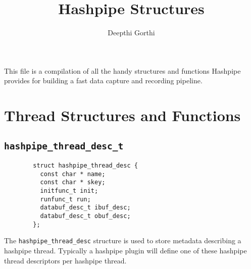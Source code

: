 \documentclass[12pt]{article}
\def\clst{\lstinline[basicstyle=\ttfamily,breaklines=true,language=C]}
\begin{document}
\title{Hashpipe Structures} \author{Deepthi Gorthi}
\maketitle

This file is a compilation of all the handy structures and functions Hashpipe 
provides for building a fast data capture and recording pipeline.

\section{Thread Structures and Functions}

\subsection{\clst{hashpipe_thread_desc_t}}

\begin{lstlisting}
        struct hashpipe_thread_desc {
          const char * name;
          const char * skey;
          initfunc_t init;
          runfunc_t run;
          databuf_desc_t ibuf_desc;
          databuf_desc_t obuf_desc;
        };
\end{lstlisting}

The \clst{hashpipe_thread_desc} structure is used to store metadata 
describing a hashpipe thread.  Typically a hashpipe plugin will 
define one of these hashpipe thread descriptors per hashpipe thread.  
\end{document}

